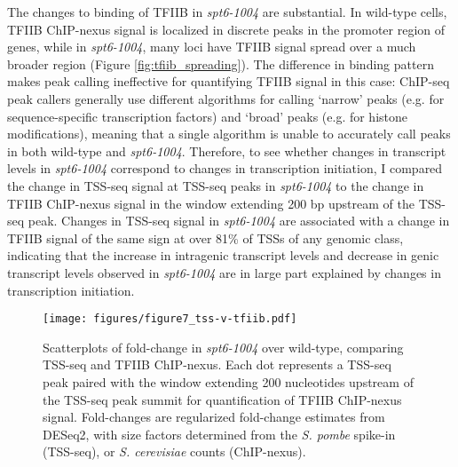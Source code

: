 \documentclass[9pt, letterpaper]{article}
\begin{document}
The changes to binding of TFIIB in \textit{spt6-1004} are substantial. In wild-type cells, TFIIB ChIP-nexus signal is localized in discrete peaks in the promoter region of genes, while in \textit{spt6-1004}, many loci have TFIIB signal spread over a much broader region (Figure \ref{fig:tfiib_spreading}). The difference in binding pattern makes peak calling ineffective for quantifying TFIIB signal in this case: ChIP-seq peak callers generally use different algorithms for calling `narrow' peaks (e.g. for sequence-specific transcription factors) and `broad' peaks (e.g. for histone modifications), meaning that a single algorithm is unable to accurately call peaks in both wild-type and \textit{spt6-1004}. Therefore, to see whether changes in transcript levels in \textit{spt6-1004} correspond to changes in transcription initiation, I compared the change in TSS-seq signal at TSS-seq peaks in \textit{spt6-1004} to the change in TFIIB ChIP-nexus signal in the window extending 200 bp upstream of the TSS-seq peak. Changes in TSS-seq signal in \textit{spt6-1004} are associated with a change in TFIIB signal of the same sign at over 81\% of TSSs of any genomic class, indicating that the increase in intragenic transcript levels and decrease in genic transcript levels observed in \textit{spt6-1004} are in large part explained by changes in transcription initiation.


\begin{figure}[h]
\centering
\texttt{[image: figures/figure7\_tss-v-tfiib.pdf]}
\caption{Scatterplots of fold-change in \textit{spt6-1004} over wild-type, comparing TSS-seq and TFIIB ChIP-nexus. Each dot represents a TSS-seq peak paired with the window extending 200 nucleotides upstream of the TSS-seq peak summit for quantification of TFIIB ChIP-nexus signal. Fold-changes are regularized fold-change estimates from DESeq2, with size factors determined from the \textit{S. pombe} spike-in (TSS-seq), or \textit{S. cerevisiae} counts (ChIP-nexus).}
\end{figure}
\end{document}
